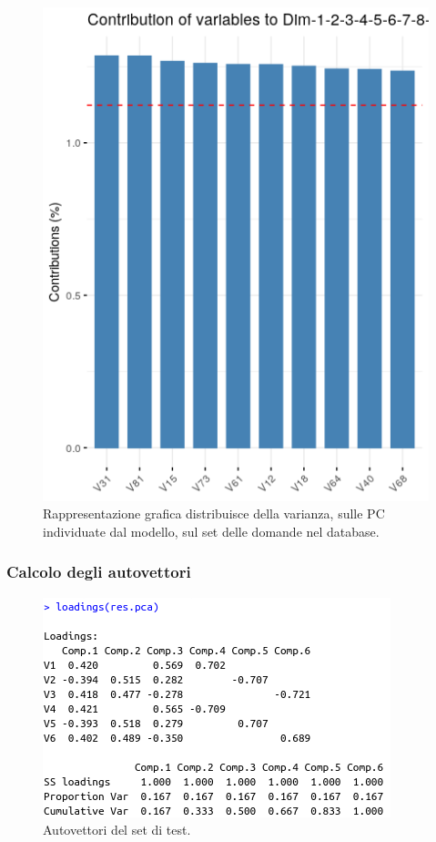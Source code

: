 \begin{figure}[H]
\centering
	\includegraphics[width=0.60\linewidth]{../../PCA/plot/varianza-complessiva_rete-db.png}
	\caption{Rappresentazione grafica distribuisce della varianza, sulle PC individuate dal modello, sul set delle domande nel database.}
	\label{Rappresentazione grafica di come la varianza si distribuisce sulle PC individuate dal modello sul set delle domande nel database.}
\end{figure}

\subsubsection{Calcolo degli autovettori}
\label{Calcolo degli autovettori}

\begin{figure}[H]
\centering
	\includegraphics[width=0.60\linewidth]{../../PCA/plot/loadings_rete-prova.png}
	\caption{Autovettori del set di test.}
	\label{Autovettori del set di test.}
\end{figure}

